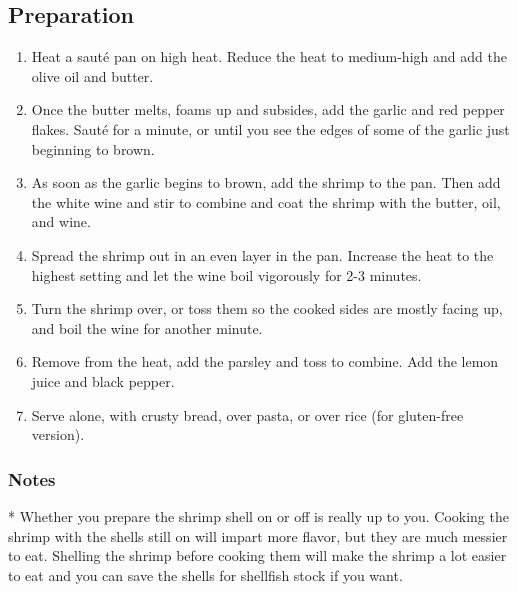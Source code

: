 \subsection{Preparation}
\begin{enumerate}
    \item Heat a saut\'e pan on high heat. Reduce the heat to medium-high and add the olive oil and butter.
    \item Once the butter melts, foams up and subsides, add the garlic and red pepper flakes. Saut\'e for a minute, or until you see the edges of some of the garlic just beginning to brown.
    \item As soon as the garlic begins to brown, add the shrimp to the pan. Then add the white wine and stir to combine and coat the shrimp with the butter, oil, and wine.
    \item Spread the shrimp out in an even layer in the pan. Increase the heat to the highest setting and let the wine boil vigorously for 2-3 minutes.
    \item Turn the shrimp over, or toss them so the cooked sides are mostly facing up, and boil the wine for another minute.
    \item Remove from the heat, add the parsley and toss to combine. Add the lemon juice and black pepper.  
    \item Serve alone, with crusty bread, over pasta, or over rice (for gluten-free 
version).
\end{enumerate}

\subsubsection{Notes}
* Whether you prepare the shrimp shell on or off is really up to you. Cooking 
  the shrimp with the shells still on will impart more flavor, but they are much
  messier to eat. Shelling the shrimp before cooking them will make the shrimp a
  lot easier to eat and you can save the shells for shellfish stock if you want.
